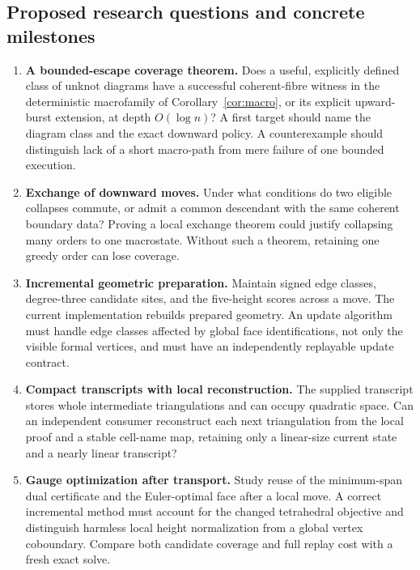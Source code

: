 \documentclass[11pt,letterpaper]{article}
\theoremstyle{definition}
\theoremstyle{remark}
\begin{document}
\subsection{Proposed research questions and concrete milestones}

\begin{enumerate}[label=\textbf{Q\arabic*.},leftmargin=*]
\item \textbf{A bounded-escape coverage theorem.} Does a useful, explicitly
defined class of unknot diagrams have a successful coherent-fibre witness
in the deterministic macrofamily of Corollary~\ref{cor:macro}, or its
explicit upward-burst extension, at depth
$O(\log n)$? A first target should name the diagram class and the exact
downward policy. A counterexample should distinguish lack of a short
macro-path from mere failure of one bounded execution.

\item \textbf{Exchange of downward moves.} Under what conditions do two
eligible collapses commute, or admit a common descendant with the same
coherent boundary data? Proving a local exchange theorem could justify
collapsing many orders to one macrostate. Without such a theorem, retaining
one greedy order can lose coverage.

\item \textbf{Incremental geometric preparation.} Maintain signed edge
classes, degree-three candidate sites, and the five-height scores across a
move. The current implementation rebuilds prepared geometry. An update
algorithm must handle edge classes affected by global face identifications,
not only the visible formal vertices, and must have an independently
replayable update contract.

\item \textbf{Compact transcripts with local reconstruction.} The supplied
transcript stores whole intermediate triangulations and can occupy
quadratic space. Can an independent consumer reconstruct each next
triangulation from the local proof and a stable cell-name map, retaining
only a linear-size current state and a nearly linear transcript?

\item \textbf{Gauge optimization after transport.} Study reuse of the
minimum-span dual certificate and the Euler-optimal face after a local
move. A correct incremental method must account for the changed tetrahedral
objective and distinguish harmless local height normalization from a
global vertex coboundary. Compare both candidate coverage and full replay
cost with a fresh exact solve.


\end{enumerate}
\end{document}
